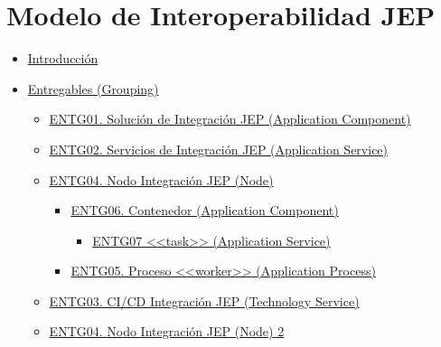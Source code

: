\documentclass[
  paper=a4,
  ,captions=tableheading
]{scrartcl}
\author{}
\date{}
\title{}
\author{}
\date{}
\providecommand{\tightlist}{%
  \setlength{\itemsep}{0pt}\setlength{\parskip}{0pt}}
\begin{document}




\section{Modelo de Interoperabilidad
JEP}\label{sec:modelo-de-interoperabilidad-jep}

\begin{itemize}
\tightlist
\item
  \hyperref[Introducciuxf3n]{Introducción}
\item
  \hyperref[entregables-grouping]{Entregables (Grouping)}

  \begin{itemize}
  \tightlist
  \item
    \hyperref[entg01.-soluciuxf3n-de-integraciuxf3n-jep-application-component]{ENTG01.
    Solución de Integración JEP (Application Component)}
  \item
    \hyperref[entg02.-servicios-de-integraciuxf3n-jep-application-service]{ENTG02.
    Servicios de Integración JEP (Application Service)}
  \item
    \hyperref[entg04.-nodo-integraciuxf3n-jep-node]{ENTG04. Nodo
    Integración JEP (Node)}

    \begin{itemize}
    \tightlist
    \item
      \hyperref[entg06.-contenedor-application-component]{ENTG06.
      Contenedor (Application Component)}

      \begin{itemize}
      \tightlist
      \item
        \hyperref[entg07-ux5cux253Cux5cux253Ctaskux5cux253Eux5cux253E-application-service]{ENTG07
        \textless\textless task\textgreater\textgreater{} (Application
        Service)}
      \end{itemize}
    \item
      \hyperref[entg05.-proceso-ux5cux253Cux5cux253Cworkerux5cux253Eux5cux253E-application-process]{ENTG05.
      Proceso \textless\textless worker\textgreater\textgreater{}
      (Application Process)}
    \end{itemize}
  \item
    \hyperref[entg03.-cicd-integraciuxf3n-jep-technology-service]{ENTG03.
    CI/CD Integración JEP (Technology Service)}
  \item
    \hyperref[entg04.-nodo-integraciuxf3n-jep-node-2]{ENTG04. Nodo
    Integración JEP (Node) 2}


\end{itemize}
\end{itemize}
\end{document}
